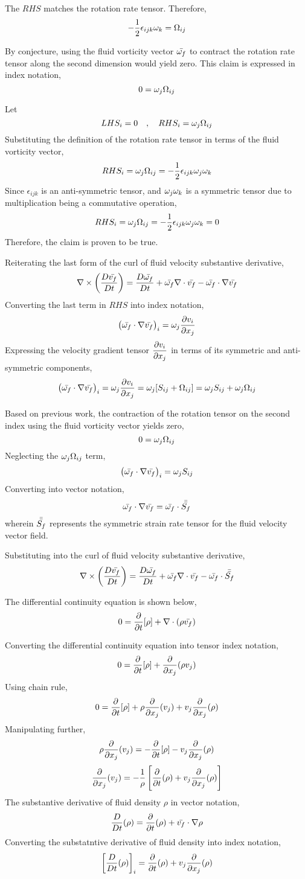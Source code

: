 \documentclass[a4paper, 12pt]{report}
\begin{document}
\begin{center}
The $RHS$ matches the rotation rate tensor. Therefore,
$$-\frac{1}{2}\epsilon_{ijk}\omega_k =  \Omega_{ij}$$

By conjecture, using the fluid vorticity vector $\bar{\omega_f}$ to contract the rotation rate tensor along the second dimension would yield zero. This claim is expressed in index notation,
$$0 = \omega_j\Omega_{ij}$$

Let 
$$LHS_i = 0 \quad,\quad RHS_i = \omega_j\Omega_{ij}$$
Substituting the definition of the rotation rate tensor in terms of the fluid vorticity vector,
$$RHS_i = \omega_j\Omega_{ij} = -\frac{1}{2}\epsilon_{ijk}\omega_j\omega_k$$
Since $\epsilon_{ijk}$ is an anti-symmetric tensor, and $\omega_j\omega_k$ is a symmetric tensor due to multiplication being a commutative operation,
$$RHS_i = \omega_j\Omega_{ij} = -\frac{1}{2}\epsilon_{ijk}\omega_j\omega_k = 0$$
Therefore, the claim is proven to be true.

Reiterating the last form of the curl of fluid velocity substantive derivative,
$$\nabla\times\left(\frac{D \bar{v_f}}{Dt}\right) = \frac{D \bar{\omega_f}}{Dt} + \bar{\omega_f}\nabla\cdot \bar{v_f} - \bar{\omega_f}\cdot\nabla \bar{v_f}$$
Converting the last term in $RHS$ into index notation,
$$\left(\bar{\omega_f}\cdot\nabla \bar{v_f}\right)_i = \omega_j\frac{\partial v_i}{\partial x_j}$$
Expressing the velocity gradient tensor $\displaystyle \frac{\partial v_i}{\partial x_j}$ in terms of its symmetric and anti-symmetric components,
$$\left(\bar{\omega_f}\cdot\nabla \bar{v_f}\right)_i = \omega_j\frac{\partial v_i}{\partial x_j} = \omega_j[S_{ij} + \Omega_{ij}] = \omega_jS_{ij} + \omega_j\Omega_{ij}$$

Based on previous work, the contraction of the rotation tensor on the second index using the fluid vorticity vector yields zero,
$$0 = \omega_j\Omega_{ij}$$
Neglecting the $\displaystyle \omega_j\Omega_{ij}$ term,
$$\left(\bar{\omega_f}\cdot\nabla \bar{v_f}\right)_i  = \omega_j S_{ij}$$
Converting into vector notation,
$$\bar{\omega_f}\cdot\nabla \bar{v_f}  = \bar{\omega_f} \cdot \bar{\bar{S_f}}$$
wherein $\bar{\bar{S_f}}$ represents the symmetric strain rate tensor for the fluid velocity vector field.

Substituting into the curl of fluid velocity substantive derivative,
$$\nabla\times\left(\frac{D \bar{v_f}}{Dt}\right) = \frac{D \bar{\omega_f}}{Dt} + \bar{\omega_f}\nabla\cdot \bar{v_f} - \bar{\omega_f} \cdot \bar{\bar{S_f}}$$


The differential continuity equation is shown below,
$$0 = \frac{\partial}{\partial t}[\rho] + \nabla\cdot(\rho\bar{v_f})$$

Converting the differential continuity equation into tensor index notation,
$$0 = \frac{\partial}{\partial t}[\rho] + \frac{\partial}{\partial x_j}(\rho v_j)$$
Using chain rule,
$$0 = \frac{\partial}{\partial t}[\rho] + \rho\frac{\partial}{\partial x_j}(v_j) + v_j\frac{\partial}{\partial x_j}(\rho)$$
Manipulating further,
$$\rho\frac{\partial}{\partial x_j}(v_j) = -\frac{\partial}{\partial t}[\rho] - v_j\frac{\partial}{\partial x_j}(\rho)$$
$$\frac{\partial}{\partial x_j}(v_j) = -\frac{1}{\rho}\left[\frac{\partial}{\partial t}(\rho) + v_j\frac{\partial}{\partial x_j}(\rho)\right]$$
The substantive derivative of fluid density $\rho$ in vector notation,
$$\frac{D }{Dt}(\rho) = \frac{\partial}{\partial t}(\rho) + \bar{v_f}\cdot\nabla\rho$$
Converting the substatntive derivative of fluid density into index notation,
$$\left[\frac{D }{Dt}(\rho)\right]_i = \frac{\partial}{\partial t}(\rho) + v_j\frac{\partial}{\partial x_j}(\rho)$$


\end{center}
\end{document}
